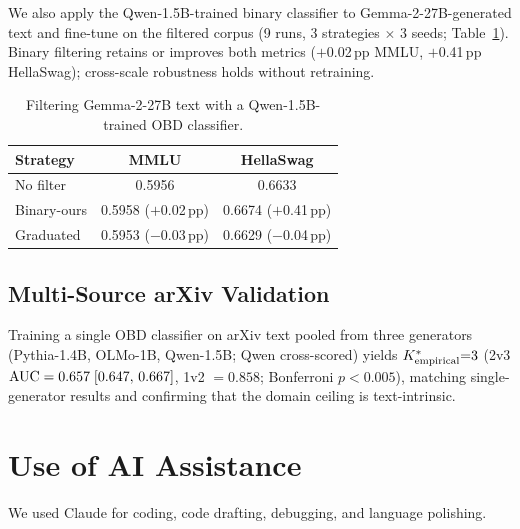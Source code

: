 We also apply the Qwen-1.5B-trained binary classifier to Gemma-2-27B-generated text and fine-tune on the filtered corpus (9 runs, 3 strategies $\times$ 3 seeds; Table~\ref{tab:gemma27b_filtering}).
Binary filtering retains or improves both metrics ($+$0.02\,pp MMLU, $+$0.41\,pp HellaSwag); cross-scale robustness holds without retraining.

\begin{table}[H]
\centering
\footnotesize
\caption{Filtering Gemma-2-27B text with a Qwen-1.5B-trained OBD classifier.}
\label{tab:gemma27b_filtering}
\begin{tabular}{lcc}
\toprule
\textbf{Strategy} & \textbf{MMLU} & \textbf{HellaSwag} \\
\midrule
No filter          & 0.5956 & 0.6633 \\
Binary-ours        & 0.5958 ($+$0.02\,pp) & 0.6674 ($+$0.41\,pp) \\
Graduated          & 0.5953 ($-$0.03\,pp) & 0.6629 ($-$0.04\,pp) \\
\bottomrule
\end{tabular}
\end{table}

\subsection{Multi-Source arXiv Validation}
\label{sec:arxiv_multi_source}

Training a single OBD classifier on arXiv text pooled from three generators (Pythia-1.4B, OLMo-1B, Qwen-1.5B; Qwen cross-scored) yields ${K^*_{\text{empirical}}}{=}3$ (2v3 $\text{AUC} = 0.657\;[0.647,\,0.667]$, 1v2 $= 0.858$; Bonferroni $p < 0.005$), matching single-generator results and confirming that the domain ceiling is text-intrinsic.

\enlargethispage{2\baselineskip}
\section{Use of AI Assistance}
\label{app:ai-assistants}

We used Claude for coding, code drafting, debugging, and language polishing.
